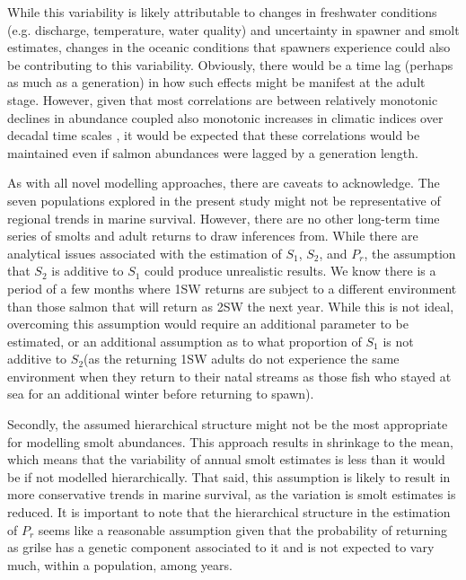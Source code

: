 \documentclass[12pt]{article}
\newcommand{\So}{$S_{1}$\xspace}
\newcommand{\St}{$S_{2}$\xspace}
\newcommand{\Pg}{$P_r$\xspace}
\begin{document}
While this variability is likely attributable to changes in freshwater
conditions (e.g. discharge, temperature, water quality) and uncertainty in
spawner and smolt estimates, 
changes in the oceanic conditions that spawners experience could also be
contributing to this variability.
Obviously, there would be a time lag (perhaps as much as a generation) in how such effects
might be manifest at the adult stage.
However, given that most correlations are between relatively monotonic declines
in abundance coupled also monotonic increases in climatic indices
over decadal time scales \citep[e.g.,][]{Friedland1998, Todd2008,
    Beaugrand2012}, it would be expected that these correlations would be
maintained even if salmon abundances were lagged by a generation length.


As with all novel modelling approaches, there are caveats to acknowledge.
The seven populations explored in the present study might not be representative
of regional trends in marine survival. However, there are no other
long-term time series of smolts and adult returns to draw inferences from.
While there are analytical issues associated with the estimation of \So, \St, and \Pg,
the assumption that \St is additive to \So could produce unrealistic results.
We know there is a period of a few months where 1SW
returns are subject to a different environment than those salmon that will
return as 2SW the next year. 
While this is not ideal,
overcoming this assumption would require an additional parameter to be
estimated, or an additional assumption as to what proportion of \So is not
additive to \St (as the returning 1SW adults do not experience the same
environment when they return to their natal streams as those fish who stayed
at sea for an additional winter before returning to spawn).

Secondly, the assumed hierarchical structure might not be the most appropriate
for modelling smolt abundances. This approach results in shrinkage to the
mean, which means that the variability of annual smolt estimates is less than
it would be if not modelled hierarchically. 
That said, this assumption is likely to result in more conservative trends in marine survival, as the
variation is smolt estimates is reduced.
It is important to note that the hierarchical structure in the estimation of
\Pg seems like a reasonable assumption given that the probability of returning
as grilse has a genetic component associated to it \citep{Aykanat2019} and is
not expected to vary much, within a population, among years.
\end{document}
